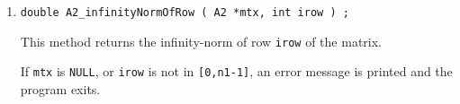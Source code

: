 \begin{enumerate}
This method returns the two-norm of row {\tt irow} of the matrix.
\par {}
If {\tt mtx} is {\tt NULL}, or {\tt irow} is not in {\tt [0,n1-1]},
an error message is printed and the program exits.
\item
\begin{verbatim}
double A2_infinityNormOfRow ( A2 *mtx, int irow ) ;
\end{verbatim}
This method returns the infinity-norm of row {\tt irow} 
of the matrix.
\par {}
If {\tt mtx} is {\tt NULL}, or {\tt irow} is not in {\tt [0,n1-1]},
an error message is printed and the program exits.
\end{enumerate}
\par
